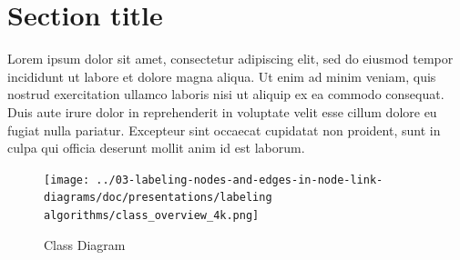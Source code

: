 \documentclass[final,nopreprintline]{elsarticle}
\begin{document}
\section{Section title}
\label{sec:sample2}

Lorem ipsum dolor sit amet, consectetur adipiscing elit, sed do eiusmod tempor incididunt ut labore et dolore magna aliqua. Ut enim ad minim veniam, quis nostrud exercitation ullamco laboris nisi ut aliquip ex ea commodo consequat. Duis aute irure dolor in reprehenderit in voluptate velit esse cillum dolore eu fugiat nulla pariatur. Excepteur sint occaecat cupidatat non proident, sunt in culpa qui officia deserunt mollit anim id est laborum.


 


\begin{landscape}
    \begin{figure}
        \centering
        \texttt{[image: ../03-labeling-nodes-and-edges-in-node-link-diagrams/doc/presentations/labeling algorithms/class\_overview\_4k.png]}
        \caption{Class Diagram}
        \label{fig:classdiag}
    \end{figure}
\end{landscape}
%
\end{document}
